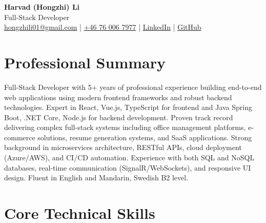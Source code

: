 \documentclass[11pt,a4paper]{article}
\begin{document}
\pagestyle{empty}

\begin{center}
{\LARGE \textbf{Harvad (Hongzhi) Li}}\\[10pt]
{\Large Full-Stack Developer}\\[10pt]
\textcolor{linkedinblue}{\href{mailto:hongzhili01@gmail.com}{hongzhili01@gmail.com} | \href{tel:+46760067977}{+46 76 006 7977} | \href{https://www.linkedin.com/in/harvad/}{LinkedIn} | \href{https://github.com/bluehawana}{GitHub}}
\end{center}

\section*{Professional Summary}

Full-Stack Developer with 5+ years of professional experience building end-to-end web applications using modern frontend frameworks and robust backend technologies. Expert in React, Vue.js, TypeScript for frontend and Java Spring Boot, .NET Core, Node.js for backend development. Proven track record delivering complex full-stack systems including office management platforms, e-commerce solutions, resume generation systems, and SaaS applications. Strong background in microservices architecture, RESTful APIs, cloud deployment (Azure/AWS), and CI/CD automation. Experience with both SQL and NoSQL databases, real-time communication (SignalR/WebSockets), and responsive UI design. Fluent in English and Mandarin, Swedish B2 level.

\section*{Core Technical Skills}
\end{document}
